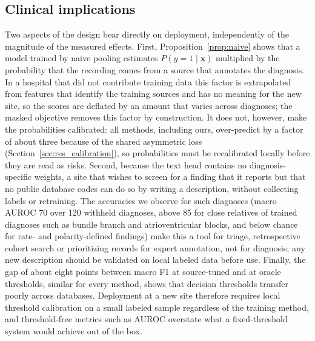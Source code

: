 \subsection{Clinical implications}\label{sec:disc_clinical}
Two aspects of the design bear directly on deployment, independently of the magnitude of the measured effects. First, Proposition~\ref{prop:naive} shows that a model trained by naive pooling estimates $P(y=1\mid\mathbf{x})$ multiplied by the probability that the recording comes from a source that annotates the diagnosis. In a hospital that did not contribute training data this factor is extrapolated from features that identify the training sources and has no meaning for the new site, so the scores are deflated by an amount that varies across diagnoses; the masked objective removes this factor by construction. It does not, however, make the probabilities calibrated: all methods, including ours, over-predict by a factor of about three because of the shared asymmetric loss (Section~\ref{sec:res_calibration}), so probabilities must be recalibrated locally before they are read as risks. Second, because the text head contains no diagnosis-specific weights, a site that wishes to screen for a finding that it reports but that no public database codes can do so by writing a description, without collecting labels or retraining. The accuracies we observe for such diagnoses (macro AUROC 70 over 120 withheld diagnoses, above 85 for close relatives of trained diagnoses such as bundle branch and atrioventricular blocks, and below chance for rate- and polarity-defined findings) make this a tool for triage, retrospective cohort search or prioritizing records for expert annotation, not for diagnosis; any new description should be validated on local labeled data before use. Finally, the gap of about eight points between macro F1 at source-tuned and at oracle thresholds, similar for every method, shows that decision thresholds transfer poorly across databases. Deployment at a new site therefore requires local threshold calibration on a small labeled sample regardless of the training method, and threshold-free metrics such as AUROC overstate what a fixed-threshold system would achieve out of the box.

